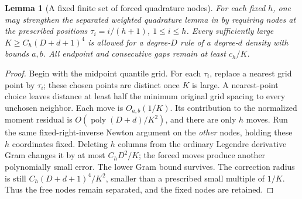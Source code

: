 \documentclass[11pt]{article}
\newtheorem{lemma}{Lemma}
\begin{document}
\begin{lemma}[A fixed finite set of forced quadrature nodes]\label{forced}
For each fixed $h$, one may strengthen the separated weighted quadrature
lemma in  by
requiring nodes at the prescribed positions
$\tau_i=i/(h+1)$, $1\le i\le h$.
Every sufficiently large $K\ge C_h(D+d+1)^4$ is allowed for a degree-$D$
rule of a degree-$d$ density with bounds $a,b$.
All endpoint and consecutive gaps remain at least $c_h/K$.
\end{lemma}
\begin{proof}
Begin with the midpoint quantile grid. For each $\tau_i$, replace a
nearest grid point by $\tau_i$; these chosen points are distinct once
$K$ is large. A nearest-point choice leaves distance at least half the
minimum original grid spacing to every unchosen neighbor. Each move
is $O_{a,b}(1/K)$. Its contribution to the normalized moment residual
is $O(\operatorname{poly}(D+d)/K^2)$, and there are only $h$ moves.
Run the same fixed-right-inverse Newton argument on the \emph{other}
nodes, holding these $h$ coordinates fixed. Deleting $h$ columns from
the ordinary Legendre derivative Gram changes it by at most $C_hD^2/K$;
the forced moves produce another polynomially small error. The lower
Gram bound survives. The correction radius is still
$C_h(D+d+1)^4/K^2$, smaller than a prescribed small multiple of $1/K$.
Thus the free nodes remain separated, and the fixed nodes are retained.
\end{proof}
\end{document}
